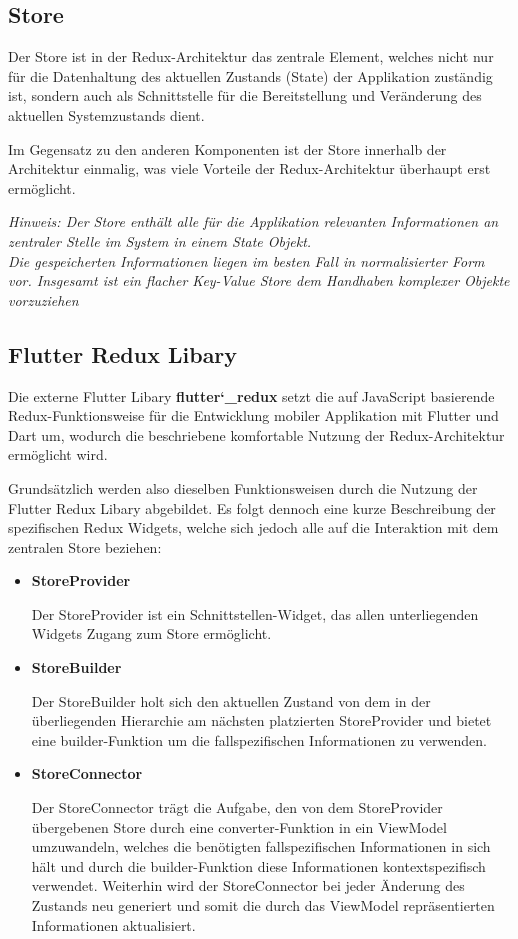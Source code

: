 \documentclass[bibliography=totoc,listof=totoc,BCOR=5mm,DIV=12,oneside]{scrbook}
\begin{document}
\subsection{Store}
\par Der Store ist in der Redux-Architektur das zentrale Element, welches nicht nur für die Datenhaltung des aktuellen Zustands (State) der Applikation zuständig ist, sondern auch als Schnittstelle für die Bereitstellung und Veränderung des aktuellen Systemzustands dient. \citep{ReduxStore}
\par Im Gegensatz zu den anderen Komponenten ist der Store innerhalb der Architektur einmalig, was viele Vorteile der Redux-Architektur überhaupt erst ermöglicht.

\par \bigskip \textit{Hinweis: Der Store enthält alle für die Applikation relevanten Informationen an zentraler Stelle im System in einem State Objekt.\\
Die gespeicherten Informationen liegen im besten Fall in normalisierter Form vor. Insgesamt ist ein flacher Key-Value Store dem Handhaben komplexer Objekte vorzuziehen}

\newpage
\subsection{Flutter Redux Libary}
\par Die externe Flutter Libary \textbf{flutter\char`_redux}\citep{FlutterReduxLib} setzt die auf JavaScript basierende Redux-Funktionsweise für die Entwicklung mobiler Applikation mit Flutter und Dart um, wodurch die beschriebene komfortable Nutzung der Redux-Architektur ermöglicht wird.

\par \bigskip Grundsätzlich werden also dieselben Funktionsweisen durch die Nutzung der Flutter Redux Libary abgebildet. Es folgt dennoch eine kurze Beschreibung der spezifischen Redux Widgets, welche sich jedoch alle auf die Interaktion mit dem zentralen Store beziehen:

\begin{itemize}
\item \textbf{StoreProvider}
\par Der StoreProvider ist ein Schnittstellen-Widget, das allen unterliegenden Widgets Zugang zum Store ermöglicht.
\item \textbf{StoreBuilder}
\par Der StoreBuilder holt sich den aktuellen Zustand von dem in der überliegenden Hierarchie am nächsten platzierten StoreProvider und bietet eine builder-Funktion um die fallspezifischen Informationen zu verwenden.
\item \textbf{StoreConnector}
\par Der StoreConnector trägt die Aufgabe, den von dem StoreProvider übergebenen Store durch eine converter-Funktion in ein ViewModel umzuwandeln, welches die benötigten fallspezifischen Informationen in sich hält und durch die builder-Funktion diese Informationen kontextspezifisch verwendet. Weiterhin wird der StoreConnector bei jeder Änderung des Zustands neu generiert und somit die durch das ViewModel repräsentierten Informationen aktualisiert.
\end{itemize}
\end{document}
